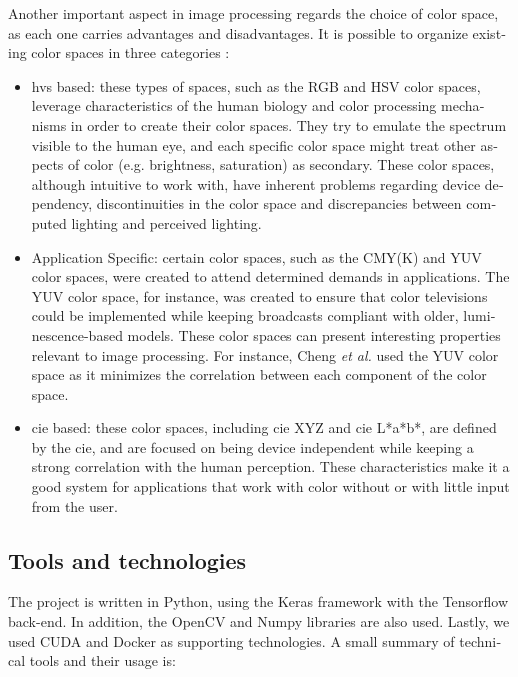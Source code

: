 \documentclass[12pt,openright,oneside,a4paper,english, brazilian]{abntex2}
\begin{document}
\begin{otherlanguage}{english}
Another important aspect in image processing regards the choice of color space, as each one carries advantages and disadvantages. It is possible to organize existing color spaces in three categories \cite{colorspace}:
\begin{itemize}
    \item \acrshort{hvs} based: these types of spaces, such as the RGB and HSV color spaces, leverage characteristics of the human biology and color processing mechanisms in order to create their color spaces. They  try to emulate the spectrum visible to the human eye, and each specific color space might treat other aspects of color (e.g. brightness, saturation) as secondary. These color spaces, although intuitive to work with, have inherent problems regarding device dependency, discontinuities in the color space and discrepancies between computed lighting and perceived lighting.
    \item Application Specific: certain color spaces, such as the CMY(K) and YUV color spaces, were created to attend determined demands in applications. The YUV color space, for instance, was created to ensure that color televisions could be implemented while keeping broadcasts compliant with older, luminescence-based models. These color spaces can present interesting properties relevant to image processing. For instance, Cheng \textit{et al.} \cite{Cheng2015} used the YUV color space as it minimizes the correlation between each component of the color space.
    \item  \acrshort{cie} based: these color spaces, including \acrshort{cie} XYZ and \acrshort{cie} L*a*b*, are defined by the \acrfull{cie},  and are focused on being device independent while keeping a strong correlation with the human perception. These characteristics make it a good system for applications that work with color without or with little input from the user.
\end{itemize}

\subsection{Tools and technologies}
The project is written in Python, using the Keras framework with the Tensorflow back-end. In addition, the OpenCV and Numpy libraries are also used. Lastly, we used CUDA and Docker as supporting technologies. A small summary of technical tools and their usage is:


\end{otherlanguage}
\end{document}
